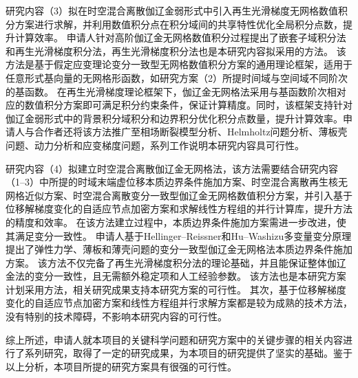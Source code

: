 研究内容（3）拟在时空混合离散伽辽金弱形式中引入再生光滑梯度无网格数值积分方案进行求解，并利用数值积分点在积分域间的共享特性优化全局积分点数，提升计算效率。
申请人针对高阶伽辽金无网格数值积分过程提出了嵌套子域积分法和再生光滑梯度积分法，再生光滑梯度积分法也是本研究内容拟采用的方法。
该方法是基于假定应变理论变分一致型无网格数值积分方案的通用理论框架，适用于任意形式基向量的无网格形函数，如研究方案（2）所提时间域与空间域不同阶次的基函数。
在再生光滑梯度理论框架下，伽辽金无网格法采用与基函数阶次相对应的数值积分方案即可满足积分约束条件，保证计算精度。同时，该框架支持针对伽辽金弱形式中的背景积分域积分和边界积分优化积分点数量，提升计算效率。申请人与合作者还将该方法推广至相场断裂模型分析、Helmholtz问题分析、薄板壳问题、动力分析和应变梯度问题，系列工作说明本研究内容具可行性。

研究内容（4）拟建立时空混合离散伽辽金无网格法，该方法需要结合研究内容（1--3）中所提的时域末端虚位移本质边界条件施加方案、时空混合离散再生核无网格近似方案、时空混合离散变分一致型伽辽金无网格数值积分方案，并引入基于位移解梯度变化的自适应节点加密方案和求解线性方程组的并行计算库，提升方法的精度和效率。
在该方法建立过程中，本质边界条件施加方案需进一步改进，使其满足变分一致性。
申请人基于Hellinger--Reissner和Hu--Washizu多变量变分原理提出了弹性力学、薄板和薄壳问题的变分一致型伽辽金无网格法本质边界条件施加方案。
该方法不仅完备了再生光滑梯度积分法的理论基础，并且能保证整体伽辽金法的变分一致性，且无需额外稳定项和人工经验参数。
该方法也是本研究方案计划采用方法，相关研究成果支持本研究方案的可行性。
其次，基于位移解梯度变化的自适应节点加密方案和线性方程组并行求解方案都是较为成熟的技术方法，没有特别的技术障碍，不影响本研究内容的可行性。

综上所述，申请人就本项目的关键科学问题和研究方案中的关键步骤的相关内容进行了系列研究，取得了一定的研究成果，为本项目的研究提供了坚实的基础。鉴于以上分析，本项目所提的研究方案具有很强的可行性。

